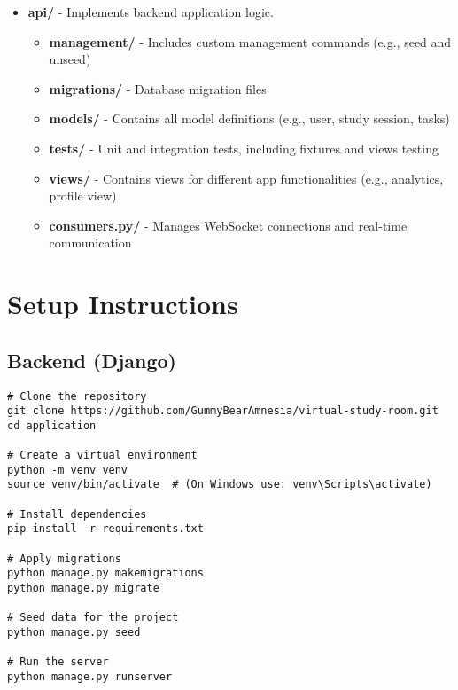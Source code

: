 \documentclass[a4paper,12pt]{article}
\begin{document}
\begin{itemize}
    \item \textbf{api/} - Implements backend application logic.
    \begin{itemize}
        \item \textbf{management/} - Includes custom management commands (e.g., seed and unseed)
            \item \textbf{migrations/} - Database migration files
            \item \textbf{models/} - Contains all model definitions (e.g., user, study session, tasks)
            \item \textbf{tests/} - Unit and integration tests, including fixtures and views testing
            \item \textbf{views/} - Contains views for different app functionalities (e.g., analytics, profile view)
            \item \textbf{consumers.py/} - Manages WebSocket connections and real-time communication
    \end{itemize}
\end{itemize}


\section{Setup Instructions}
\subsection{Backend (Django)}
\begin{verbatim}
# Clone the repository
git clone https://github.com/GummyBearAmnesia/virtual-study-room.git
cd application

# Create a virtual environment
python -m venv venv
source venv/bin/activate  # (On Windows use: venv\Scripts\activate)

# Install dependencies
pip install -r requirements.txt

# Apply migrations
python manage.py makemigrations
python manage.py migrate

# Seed data for the project
python manage.py seed

# Run the server
python manage.py runserver
\end{verbatim}
\end{document}
